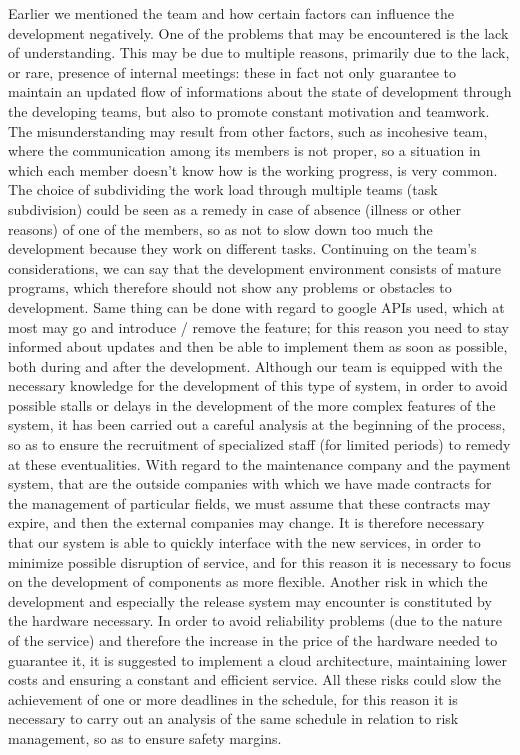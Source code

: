 \documentclass[10pt, a4paper,titlepage]{article}
\begin{document}
Earlier we mentioned the team and how certain factors can influence the development negatively.
One of the problems that may be encountered is the lack of understanding. This may be due to multiple reasons, primarily due to the lack, or rare, presence of internal meetings: these in fact not only guarantee to maintain an updated flow of informations about the state of development through the developing teams, but also to promote constant motivation and teamwork.
The misunderstanding may result from other factors, such as incohesive team, where the communication among its members is not proper, so a situation in which each member doesn’t know how is the working progress, is very common.
The choice of subdividing the work load through multiple teams (task subdivision) could be seen as a remedy in case of absence (illness or other reasons) of one of the members, so as not to slow down too much the development because they work on different tasks.
Continuing on the team's considerations, we can say that the development environment consists of mature programs, which therefore should not show any problems or obstacles to development. Same thing can be done with regard to google APIs used, which at most may go and introduce / remove the feature; for this reason you need to stay informed about updates and then be able to implement them as soon as possible, both during and after the development.
Although our team is equipped with the necessary knowledge for the development of this type of system, in order to avoid possible stalls or delays in the development of the more complex features of the system, it has been carried out a careful analysis at the beginning of the process, so as to ensure the recruitment of specialized staff (for limited periods) to remedy at these eventualities.
With regard to the maintenance company and the payment system, that are the outside companies with which we have made contracts for the management of particular fields, we must assume that these contracts may expire, and then the external companies may change. It is therefore necessary that our system is able to quickly interface with the new services, in order to minimize possible disruption of service, and for this reason it is necessary to focus on the development of components as more flexible.
Another risk in which the development and especially the release system may encounter is constituted by the hardware necessary. In order to avoid reliability problems (due to the nature of the service) and therefore the  increase in the price of the hardware needed to guarantee it, it is suggested to implement a cloud architecture, maintaining lower costs and ensuring a constant and efficient service.
All these risks could slow the achievement of one or more deadlines in the schedule, for this reason it is necessary to carry out an analysis of the same schedule in relation to risk management, so as to ensure safety margins.
\end{document}

